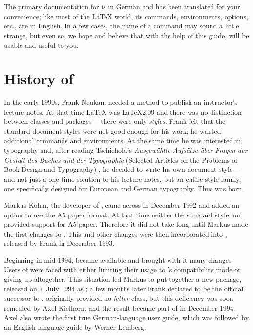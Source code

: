 \begin{Explain} 
  The primary documentation for {\KOMAScript} is in German and has been
  translated for your convenience; like most of the {\LaTeX} world, its
  commands, environments, options, etc., are in English. In a few cases, the
  name of a command may sound a little strange, but even so, we hope and
  believe that with the help of this guide, {\KOMAScript} will be usable
  and useful to you.
\end{Explain}


\section{History of {\KOMAScript}}

In the early 1990s, Frank Neukam needed a method to publish an
instructor's lecture notes. At that time {\LaTeX} was {\LaTeX}2.09 and there
was no distinction between classes and packages\,---\,there were only
\emph{styles}.  Frank felt that the standard document styles were not
good enough for his work; he wanted additional commands and
environments. At the same time he was interested in typography and,
after reading Tschichold's \emph{Ausgew\"ahlte Aufs\"atze \"uber Fragen der
Gestalt des Buches und der Typographie} (Selected Articles on the
Problems of Book Design and Typography) \cite{JTsch87}, he decided to
write his own document style\,---\,and not just a one-time solution to his
lecture notes, but an entire style family, one specifically designed for
European and German typography. Thus {\Script} was born.

Markus Kohm, the developer of {\KOMAScript}, came across {\Script} in December
1992 and added an option to use the A5 paper format. At that time neither the
standard style nor {\Script} provided support for A5 paper. Therefore it did
not take long until Markus made the first changes to {\Script}. This and other
changes were then incorporated into {\ScriptII}, released by Frank in December
1993.

Beginning in mid-1994, {\LaTeXe} became available and brought with it
many changes. Users of {\ScriptII} were faced with either limiting their
usage to {\LaTeXe}'s compatibility mode or giving up {\Script}
altogether.  This situation led Markus to put together a new {\LaTeXe}
package, released on 7~July 1994 as {\KOMAScript}; a few months later
Frank declared {\KOMAScript} to be the official successor to {\Script}.
{\KOMAScript} originally provided no \emph{letter} class, but this
deficiency was soon remedied by Axel Kielhorn, and the result became part
of {\KOMAScript} in December 1994.  Axel also wrote the first true
German-language user guide, which was followed by an English-language
guide by Werner Lemberg.

